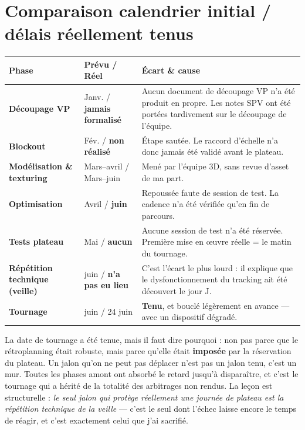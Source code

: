 \documentclass[11pt,a4paper]{report}
\begin{document}
\section{Comparaison calendrier initial / délais réellement tenus}
\begin{center}
\small
\begin{tabularx}{\textwidth}{>{\bfseries}p{2.6cm} >{\RaggedRight\arraybackslash}p{4.2cm} >{\RaggedRight\arraybackslash}p{5.8cm}}
\toprule
\rowcolor{brjaune}\textbf{Phase} & \textbf{Prévu / Réel} & \textbf{Écart \& cause} \\
\midrule
Découpage VP & Janv. / \textbf{jamais formalisé} & Aucun document de découpage VP n'a été produit en propre. Les notes SPV ont été portées tardivement sur le découpage de l'équipe. \\
Blockout & Fév. / \textbf{non réalisé} & Étape sautée. Le raccord d'échelle n'a donc jamais été validé avant le plateau. \\
Modélisation \& texturing & Mars--avril / Mars--juin & Mené par l'équipe 3D, sans revue d'asset de ma part. \\
Optimisation & Avril / \textbf{juin} & Repoussée faute de session de test. La cadence n'a été vérifiée qu'en fin de parcours. \\
Tests plateau & Mai / \textbf{aucun} & Aucune session de test n'a été réservée. Première mise en \oe uvre réelle = le matin du tournage. \\
Répétition technique (veille) & 23 juin / \textbf{n'a pas eu lieu} & C'est l'écart le plus lourd : il explique que le dysfonctionnement du tracking ait été découvert le jour J. \\
Tournage & 24 juin / 24 juin & \textbf{Tenu}, et bouclé légèrement en avance --- avec un dispositif dégradé. \\
\bottomrule
\end{tabularx}
\end{center}

La date de tournage a été tenue, mais il faut dire pourquoi : non pas parce que le rétroplanning
était robuste, mais parce qu'elle était \textbf{imposée} par la réservation du plateau. Un jalon
qu'on ne peut pas déplacer n'est pas un jalon tenu, c'est un mur. Toutes les phases amont ont
absorbé le retard jusqu'à disparaître, et c'est le tournage qui a hérité de la totalité des
arbitrages non rendus. La leçon est structurelle : \emph{le seul jalon qui protège réellement une
journée de plateau est la répétition technique de la veille} --- c'est le seul dont l'échec laisse
encore le temps de réagir, et c'est exactement celui que j'ai sacrifié.
\end{document}
